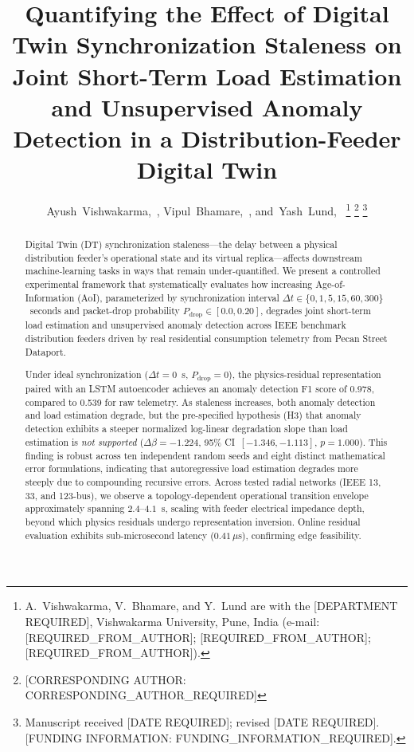 \documentclass[journal]{IEEEtran}
\newcommand{\dtsync}{\Delta t}
\newcommand{\pdrop}{P_{\mathrm{drop}}}
\newcommand{\dbeta}{\Delta\beta}
\begin{document}
\title{Quantifying the Effect of Digital Twin Synchronization Staleness on Joint Short-Term Load Estimation and Unsupervised Anomaly Detection in a Distribution-Feeder Digital Twin}

\author{Ayush~Vishwakarma,~,
        Vipul~Bhamare,~,
        and~Yash~Lund,~%
\thanks{A.~Vishwakarma, V.~Bhamare, and Y.~Lund are with the [DEPARTMENT REQUIRED], Vishwakarma University, Pune, India (e-mail: [REQUIRED\_FROM\_AUTHOR]; [REQUIRED\_FROM\_AUTHOR]; [REQUIRED\_FROM\_AUTHOR]).}%
\thanks{[CORRESPONDING AUTHOR: CORRESPONDING\_AUTHOR\_REQUIRED]}%
\thanks{Manuscript received [DATE REQUIRED]; revised [DATE REQUIRED]. [FUNDING INFORMATION: FUNDING\_INFORMATION\_REQUIRED].}}

\maketitle

\begin{abstract}
Digital Twin (DT) synchronization staleness---the delay between a physical distribution feeder's operational state and its virtual replica---affects downstream machine-learning tasks in ways that remain under-quantified. We present a controlled experimental framework that systematically evaluates how increasing Age-of-Information (AoI), parameterized by synchronization interval $\dtsync \in \{0, 1, 5, 15, 60, 300\}$~seconds and packet-drop probability $\pdrop \in [0.0, 0.20]$, degrades joint short-term load estimation and unsupervised anomaly detection across IEEE benchmark distribution feeders driven by real residential consumption telemetry from Pecan Street Dataport.

Under ideal synchronization ($\dtsync = 0$~s, $\pdrop = 0$), the physics-residual representation paired with an LSTM autoencoder achieves an anomaly detection F1 score of 0.978, compared to 0.539 for raw telemetry. As staleness increases, both anomaly detection and load estimation degrade, but the pre-specified hypothesis (H3) that anomaly detection exhibits a steeper normalized log-linear degradation slope than load estimation is \emph{not supported} ($\dbeta = -1.224$, 95\% CI~$[-1.346, -1.113]$, $p = 1.000$). This finding is robust across ten independent random seeds and eight distinct mathematical error formulations, indicating that autoregressive load estimation degrades more steeply due to compounding recursive errors. Across tested radial networks (IEEE 13, 33, and 123-bus), we observe a topology-dependent operational transition envelope approximately spanning $2.4$--$4.1$~s, scaling with feeder electrical impedance depth, beyond which physics residuals undergo representation inversion. Online residual evaluation exhibits sub-microsecond latency ($0.41\,\mu$s), confirming edge feasibility.
\end{abstract}
\end{document}
